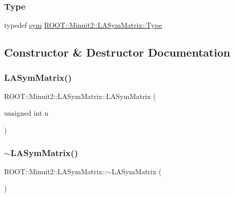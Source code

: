 \subsubsection{\texorpdfstring{Type}{Type}\hspace{0.1cm}{\footnotesize\ttfamily [3/3]}}
{\footnotesize\ttfamily typedef \mbox{\hyperlink{classROOT_1_1Minuit2_1_1sym}{sym}} \mbox{\hyperlink{classROOT_1_1Minuit2_1_1LASymMatrix_a339ed010f480472ba1029aef21c149ea}{R\+O\+O\+T\+::\+Minuit2\+::\+L\+A\+Sym\+Matrix\+::\+Type}}}



\subsection{Constructor \& Destructor Documentation}
\mbox{\label{classROOT_1_1Minuit2_1_1LASymMatrix_a9fe58788095d0860bb44bde53457782c}} 
\subsubsection{\texorpdfstring{LASymMatrix()}{LASymMatrix()}\hspace{0.1cm}{\footnotesize\ttfamily [1/30]}}
{\footnotesize\ttfamily R\+O\+O\+T\+::\+Minuit2\+::\+L\+A\+Sym\+Matrix\+::\+L\+A\+Sym\+Matrix (\begin{DoxyParamCaption}\item[{unsigned int}]{n }\end{DoxyParamCaption})\hspace{0.3cm}{\ttfamily [inline]}}

\mbox{\label{classROOT_1_1Minuit2_1_1LASymMatrix_a6de4c2f5940002a13411348985d1b784}} 
\subsubsection{\texorpdfstring{$\sim$LASymMatrix()}{~LASymMatrix()}\hspace{0.1cm}{\footnotesize\ttfamily [1/3]}}
{\footnotesize\ttfamily R\+O\+O\+T\+::\+Minuit2\+::\+L\+A\+Sym\+Matrix\+::$\sim$\+L\+A\+Sym\+Matrix (\begin{DoxyParamCaption}{ }\end{DoxyParamCaption})\hspace{0.3cm}{\ttfamily [inline]}}


